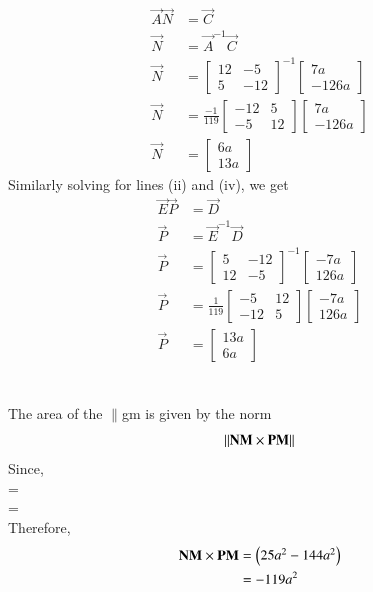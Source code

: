 \documentclass[journal,12pt,twocolumn]{IEEEtran}
\begin{document}
\begin{align*}
\vec{A}\vec{N} &=\vec{C} \\
\vec{N} &= \vec{A}^{-1}\vec{C} \\
\vec{N}
& =
\begin{bmatrix}
12 & -5 \\
5 & -12 
\end{bmatrix}^{-1}
\begin{bmatrix}
7a \\ -126a
\end{bmatrix}  \\[6pt]
\vec{N}
& =
\frac{-1}{119}
\begin{bmatrix}
-12 & 5 \\
-5 & 12 
\end{bmatrix}
\begin{bmatrix}
7a \\ -126a
\end{bmatrix} \\[6pt]
\vec{N}
&=
\begin{bmatrix}
6a \\ 13a
\end{bmatrix}
\end{align*}
Similarly solving for lines (ii) and (iv), we get
\begin{align*}
\vec{E}\vec{P} &=\vec{D} \\
\vec{P} &= \vec{E}^{-1}\vec{D} \\
\vec{P}
& =
\begin{bmatrix}
5 & -12 \\
12 & -5 
\end{bmatrix}^{-1}
\begin{bmatrix}
-7a \\ 126a
\end{bmatrix}  \\[6pt]
\vec{P}
& =
\frac{1}{119}
\begin{bmatrix}
-5 & 12 \\
-12 & 5 
\end{bmatrix}
\begin{bmatrix}
-7a \\ 126a
\end{bmatrix} \\[6pt]
\vec{P}
&=
\begin{bmatrix}
13a \\ 6a
\end{bmatrix}
\end{align*}\\ \\
The area of the $\parallel$gm is given by the norm $$\lVert\mathbf{NM}\times\mathbf{PM}\rVert $$
Since, \\
 = \\
 = \\
Therefore, \\
\begin{align*}
\mathbf{NM}\times\mathbf{PM}&=\begin{pmatrix}25a^2 - 144a^2\end{pmatrix}\\
&={-119a^2}
\end{align*}
\end{document}
